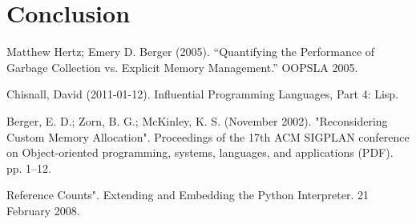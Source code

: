 \documentclass{article}
\begin{document}
\section{Conclusion}
\newpage
\begin{thebibliography}{}
  Matthew Hertz; Emery D. Berger (2005). ``Quantifying the Performance of Garbage Collection vs. Explicit Memory Management.'' OOPSLA 2005.

  Chisnall, David (2011-01-12). Influential Programming Languages, Part 4: Lisp.
  
  Berger, E. D.; Zorn, B. G.; McKinley, K. S. (November 2002). "Reconsidering Custom Memory Allocation". Proceedings of the 17th ACM SIGPLAN conference on Object-oriented programming, systems, languages, and applications (PDF). pp. 1–12.

  Reference Counts". Extending and Embedding the Python Interpreter. 21 February 2008.
\end{thebibliography}
\end{document}
